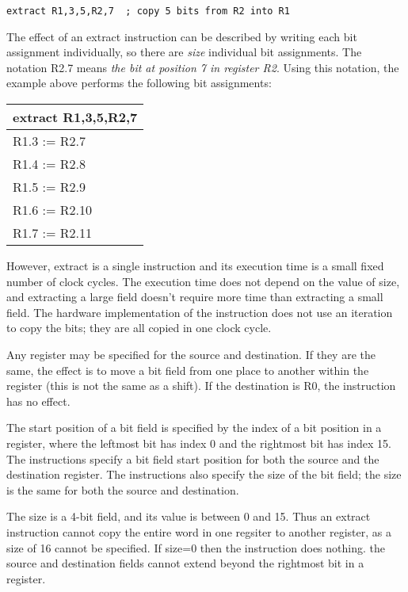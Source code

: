 \documentclass[11pt]{article}
\begin{document}
\begin{itemize}
\begin{verbatim}
extract R1,3,5,R2,7  ; copy 5 bits from R2 into R1
\end{verbatim}

The effect of an extract instruction can be described by writing each
bit assignment individually, so there are \emph{size} individual bit
assignments.  The notation R2.7 means \emph{the bit at position 7 in
register R2}.  Using this notation, the example above performs the
following bit assignments:

\begin{center}
\begin{tabular}{l}
extract R1,3,5,R2,7\\
\hline
R1.3 := R2.7\\
R1.4 := R2.8\\
R1.5 := R2.9\\
R1.6 := R2.10\\
R1.7 := R2.11\\
\end{tabular}
\end{center}

However, extract is a single instruction and its execution time is a
small fixed number of clock cycles.  The execution time does not
depend on the value of size, and extracting a large field doesn't
require more time than extracting a small field. The hardware
implementation of the instruction does not use an iteration to copy
the bits; they are all copied in one clock cycle.

Any register may be specified for the source and destination.  If they
are the same, the effect is to move a bit field from one place to
another within the register (this is not the same as a shift).  If the
destination is R0, the instruction has no effect.

The start position of a bit field is specified by the index of a bit
position in a register, where the leftmost bit has index 0 and the
rightmost bit has index 15. The instructions specify a bit field start
position for both the source and the destination register.  The
instructions also specify the size of the bit field; the size is the
same for both the source and destination.

The size is a 4-bit field, and its value is between 0 and 15.  Thus an
extract instruction cannot copy the entire word in one regsiter to
another register, as a size of 16 cannot be specified.  If size=0 then
the instruction does nothing.  the source and destination fields
cannot extend beyond the rightmost bit in a register.


\end{itemize}
\end{document}
